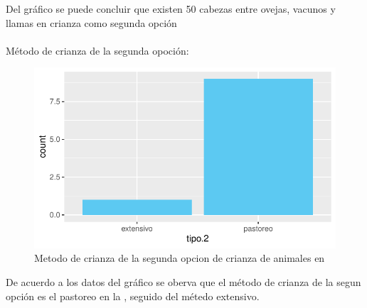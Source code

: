 \documentclass[12pt]{article}\usepackage[]{graphicx}\usepackage[]{xcolor}
\makeatletter
\def\maxwidth{ %
  \ifdim\Gin@nat@width>\linewidth
    \linewidth
  \else
    \Gin@nat@width
  \fi
}
\newenvironment{knitrout}{}{} %
\makeatother
\begin{document}
	Del gráfico se puede concluir que existen 50 cabezas entre ovejas, vacunos y llamas en crianza como segunda opción\\
	\\ 
	Método de crianza de la segunda opoción:
	\begin{figure}[H]
	\centering
\begin{knitrout}
\color{fgcolor}
\includegraphics[width=\maxwidth]{figure/twenty-1} 
\end{knitrout}
	\caption{Metodo de crianza de la segunda opcion de crianza de animales en \comunidad}
	\end{figure}
	De acuerdo a los datos del gráfico se oberva que el método de crianza de la segun opción es el pastoreo en la \comunidad, seguido del métedo extensivo.\\
	\\
	
\end{document}
